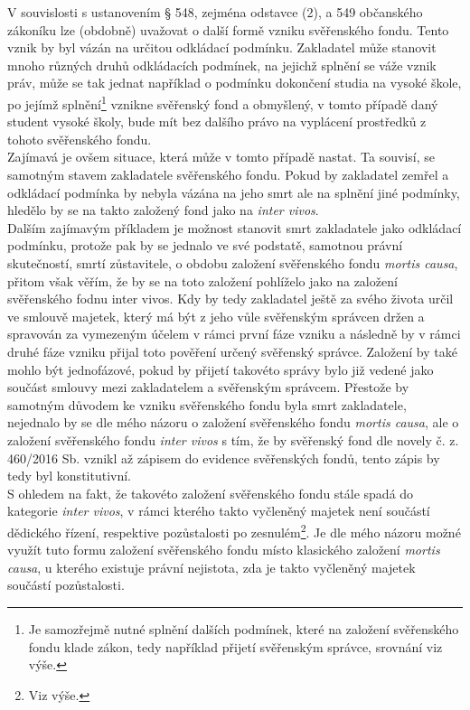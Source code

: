 \documentclass{article}
\begin{document}
V souvislosti s ustanovením § 548, zejména odstavce (2), a 549 občanského zákoníku lze (obdobně) uvažovat o další formě vzniku svěřenského fondu. Tento vznik by byl vázán na určitou odkládací podmínku. Zakladatel může stanovit mnoho různých druhů odkládacích podmínek, na jejichž splnění se váže vznik práv, může se tak jednat například o podmínku dokončení studia na vysoké škole, po jejímž splnění\footnote{Je samozřejmě nutné splnění dalších podmínek, které na založení svěřenského fondu klade zákon, tedy například přijetí svěřenským správce, srovnání viz výše.} vznikne svěřenský fond a obmyšlený, v tomto případě daný student vysoké školy, bude mít bez dalšího právo na vyplácení prostředků z tohoto svěřenského fondu.\\

Zajímavá je ovšem situace, která může v tomto případě nastat. Ta souvisí, se samotným stavem zakladatele svěřenského fondu. Pokud by zakladatel zemřel a odkládací podmínka by nebyla vázána na jeho smrt ale na splnění jiné podmínky, hledělo by se na takto založený fond jako na \textit{inter vivos}.\\


Dalším zajímavým příkladem je možnost stanovit smrt zakladatele jako odkládací podmínku, protože pak by se jednalo ve své podstatě, samotnou právní skutečností, smrtí zůstavitele, o obdobu založení svěřenského fondu \textit{mortis causa}, přitom však věřím, že by se na toto založení pohlíželo jako na založení svěřenského fodnu {inter vivos}. Kdy by tedy zakladatel ještě za svého života určil ve smlouvě majetek, který má být z jeho vůle svěřenským správcen držen a spravován za vymezeným účelem v rámci první fáze vzniku a následně by v rámci druhé fáze vzniku přijal toto pověření určený svěřenský správce. Založení by také mohlo být jednofázové, pokud by přijetí takovéto správy bylo již vedené jako součást smlouvy mezi zakladatelem a svěřenským správcem. Přestože by samotným důvodem ke vzniku svěřenského fondu byla smrt zakladatele, nejednalo by se dle mého názoru o založení svěřenského fondu \textit{mortis causa}, ale o založení svěřenského fondu \textit{inter vivos} s tím, že by svěřenský fond dle novely č. z. 460/2016 Sb. vznikl až zápisem do evidence svěřenských fondů, tento zápis by tedy byl konstitutivní.\\

S ohledem na fakt, že takovéto založení svěřenského fondu stále spadá do kategorie \textit{inter vivos}, v rámci kterého takto vyčleněný majetek není součástí dědického řízení, respektive pozůstalosti po zesnulém\footnote{Viz výše.}. Je dle mého názoru možné využít tuto formu založení svěřenského fondu místo klasického založení \textit{mortis causa}, u kterého existuje právní nejistota, zda je takto vyčleněný majetek součástí pozůstalosti.\\
\end{document}
